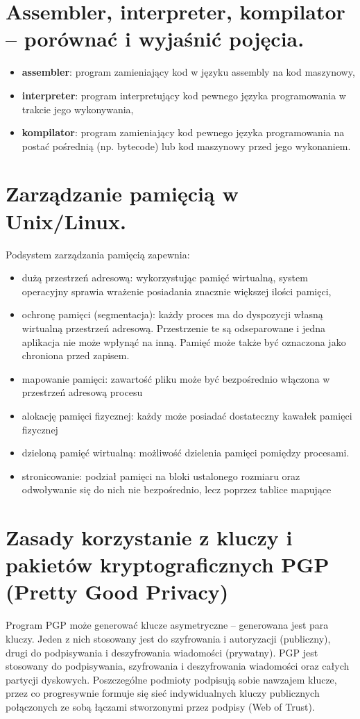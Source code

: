 \documentclass[12pt,a4paper]{article}
\begin{document}
	\section{Assembler, interpreter, kompilator – porównać i wyjaśnić pojęcia.}
	\begin{itemize}	
		\item \textbf{assembler}: program zamieniający kod w języku assembly na kod maszynowy,
		\item \textbf{interpreter}: program interpretujący kod pewnego języka programowania w trakcie jego wykonywania,
		\item \textbf{kompilator}: program zamieniający kod pewnego języka programowania na postać pośrednią (np. bytecode) lub kod maszynowy przed jego wykonaniem.
	\end{itemize}	

	\section{Zarządzanie pamięcią w Unix/Linux.}
	Podsystem zarządzania pamięcią zapewnia:
	\begin{itemize}
		\item 	dużą przestrzeń adresową: wykorzystując pamięć wirtualną, system operacyjny sprawia wrażenie posiadania znacznie większej ilości pamięci,
		\item ochronę pamięci (segmentacja): każdy proces ma do dyspozycji własną wirtualną przestrzeń adresową. Przestrzenie te są odseparowane i jedna aplikacja nie może wpłynąć na inną. Pamięć może także być oznaczona jako chroniona przed zapisem.
		\item mapowanie pamięci: zawartość pliku może być bezpośrednio włączona w przestrzeń adresową procesu
		\item alokację pamięci fizycznej: każdy może posiadać dostateczny kawałek pamięci fizycznej
		\item dzieloną pamięć wirtualną: możliwość dzielenia pamięci pomiędzy procesami.
		\item stronicowanie: podział pamięci na bloki ustalonego rozmiaru oraz odwoływanie się do nich nie bezpośrednio, lecz poprzez tablice mapujące
	\end{itemize}

	\section{Zasady korzystanie z kluczy i pakietów kryptograficznych PGP (Pretty Good Privacy)}
	Program PGP może generować klucze asymetryczne -- generowana jest para kluczy. Jeden z nich stosowany jest do szyfrowania i autoryzacji (publiczny), drugi do podpisywania i deszyfrowania wiadomości (prywatny). PGP jest stosowany do podpisywania, szyfrowania i deszyfrowania wiadomości oraz całych partycji dyskowych. Poszczególne podmioty podpisują sobie nawzajem klucze, przez co progresywnie formuje się sieć indywidualnych kluczy publicznych połączonych ze sobą łączami stworzonymi przez podpisy (Web of Trust).
\end{document}
